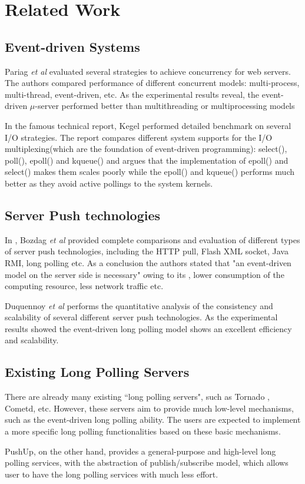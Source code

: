 \section{Related Work\\}

\subsection{Event-driven Systems\\}

Pariag \emph{et al} \cite{David} evaluated several strategies to achieve concurrency
for web servers. The authors compared performance of different concurrent models:
multi-process, multi-thread, event-driven, etc.  As the experimental 
results reveal, the event-driven $\mu$-server performed better than 
multithreading or multiprocessing models
    
In the famous technical report\cite{C10K}, Kegel performed detailed
benchmark on several I/O strategies. The report compares different 
system supports for the I/O multiplexing(which are the foundation
of event-driven programming): select(), poll(), epoll() and kqueue() 
and argues that the implementation of epoll() and select() makes them
scales poorly while the epoll() and kqueue() performs much better as
they avoid active pollings to the system kernels.

\subsection{Server Push technologies\\}

In \cite{Engin}, Bozdag \emph{et al} provided complete comparisons 
and evaluation of different types of server push technologies, including the 
HTTP pull, Flash XML socket, Java RMI, long polling etc. As a conclusion the
authors stated that "an event-driven model on the server side is necessary" 
owing to its , lower consumption of the computing resource, less network
traffic etc.

Duquennoy \emph{et al} \cite{duquennoy09consistency} performs the quantitative 
analysis of the consistency and scalability of several different server
push technologies. As the experimental results showed the event-driven
long polling model shows an excellent efficiency and scalability.

\subsection{Existing Long Polling Servers}
There are already many existing ``long polling servers", such as 
Tornado \cite{Tornado}, Cometd\cite{CometD}, etc. However, these 
servers aim to provide much low-level mechanisms, such as the 
event-driven long polling ability. The users are expected to 
implement a more specific long polling functionalities based on 
these basic mechanisms.

PushUp, on the other hand, provides a general-purpose and high-level 
long polling services, with the abstraction of publish/subscribe model,
which allows user to have the long polling services with much less
effort.
